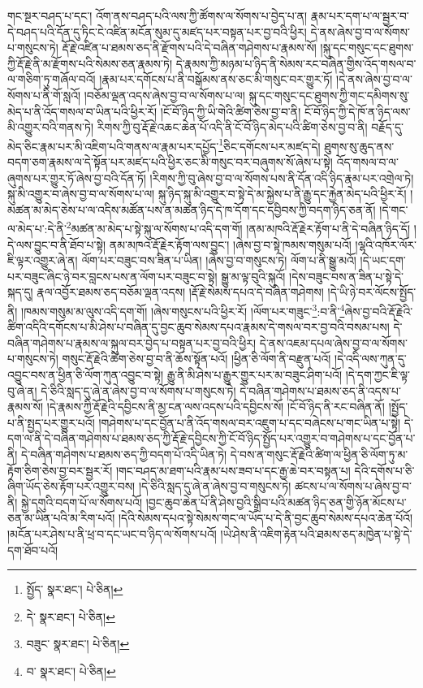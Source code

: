 གང་སྔར་བཤད་པ་དང་། འོག་ནས་བཤད་པའི་ལས་ཀྱི་ཚོགས་ལ་སོགས་པ་བྱེད་པ་ན། རྣམ་པར་དག་པ་ལ་སྦྱར་བ་དེ་བཤད་པའི་དོན་དུ་ཏིང་ངེ་འཛིན་མངོན་སུམ་དུ་མཛད་པར་བསྟན་པར་བྱ་བའི་ཕྱིར། དེ་ནས་ཞེས་བྱ་བ་ལ་སོགས་པ་གསུངས་ཏེ། རྡོ་རྗེ་འཛིན་པ་ཐམས་ཅད་ནི་རྫོགས་པའི་དེ་བཞིན་གཤེགས་པ་རྣམས་སོ། །སྐུ་དང་གསུང་དང་ཐུགས་ཀྱི་རྡོ་རྗེ་ནི་མ་རྫོགས་པའི་སེམས་ཅན་རྣམས་ཏེ། དེ་རྣམས་ཀྱི་མཉམ་པ་ཉིད་ནི་སེམས་རང་བཞིན་གྱིས་འོད་གསལ་བ་ལ་གཅིག་ཏུ་གཞོལ་བའོ། །རྣམ་པར་དགོངས་པ་ནི་བསྒོམས་ནས་ཅང་མི་གསུང་བར་གྱུར་ཏོ། །དེ་ནས་ཞེས་བྱ་བ་ལ་སོགས་པ་ནི་གོ་སླའོ། །བཅོམ་ལྡན་འདས་ཞེས་བྱ་བ་ལ་སོགས་པ་ལ། སྐུ་དང་གསུང་དང་ཐུགས་ཀྱི་གང་དམིགས་སུ་མེད་པ་ནི་འོད་གསལ་བ་ཡིན་པའི་ཕྱིར་རོ། །ངོ་བོ་ཉིད་ཀྱི་ཡི་གེའི་ཚིག་ཅེས་བྱ་བ་ནི། ངོ་བོ་ཉིད་ཀྱི་དེ་ཁོ་ན་ཉིད་ལས་མི་འགྱུར་བའི་གནས་ཏེ། རིགས་ཀྱི་བུ་རྡོ་རྗེ་འཆང་ཆེན་པོ་འདི་ནི་ངོ་བོ་ཉིད་མེད་པའི་ཚིག་ཅེས་བྱ་བ་ནི། བརྗོད་དུ་མེད་ཅིང་རྣམ་པར་མི་འཇིག་པའི་གནས་ལ་རྣམ་པར་དཔྱོད་\footnote{སྤྱོད་  སྣར་ཐང་།  པེ་ཅིན། }ཅིང་དགོངས་པར་མཛད་དེ། ཐུགས་སུ་ཆུད་ནས་བདག་ཅག་རྣམས་ལ་དེ་སྟོན་པར་མཛད་པའི་ཕྱིར་ཅང་མི་གསུང་བར་བཞུགས་སོ་ཞེས་པ་སྟེ། འོད་གསལ་བ་ལ་ཞུགས་པར་གྱུར་ཏོ་ཞེས་བྱ་བའི་དོན་ཏོ། །རིགས་ཀྱི་བུ་ཞེས་བྱ་བ་ལ་སོགས་པས་ནི་དོན་འདི་ཉིད་རྣམ་པར་འགྲེལ་ཏེ། སྐུ་མི་འགྱུར་བ་ཞེས་བྱ་བ་ལ་སོགས་པ་ལ། སྐུ་ཉིད་སྐུ་མི་འགྱུར་བ་སྟེ་དེ་མ་སྐྱེས་པ་ནི་རྒྱུ་དང་རྐྱེན་མེད་པའི་ཕྱིར་རོ། །མཚན་མ་མེད་ཅེས་པ་ལ་འདིས་མཚོན་པས་ན་མཚན་ཉིད་དེ་ཁ་དོག་དང་དབྱིབས་ཀྱི་བདག་ཉིད་ཅན་ནོ། །དེ་གང་ལ་མེད་པ་:དེ་ནི་\footnote{དེ་  སྣར་ཐང་།  པེ་ཅིན། }མཚན་མ་མེད་པ་སྟེ་སྐུ་ལ་སོགས་པ་འདི་དག་གོ། །ནམ་མཁའི་རྡོ་རྗེར་རྟོག་པ་ནི་དེ་བཞིན་ཉིད་དོ། །དེ་ལས་བྱུང་བ་ནི་ཐོབ་པ་སྟེ། ནམ་མཁའ་རྡོ་རྗེར་རྟོག་ལས་བྱུང་། །ཞེས་བྱ་བ་སྟེ་ཁམས་གསུམ་པའོ། །ལྷའི་འཁོར་ལོར་ཇི་ལྟར་འགྱུར་ཞེ་ན། ལོག་པར་བཟུང་བས་ཟིན་པ་ཡིན། །ཞེས་བྱ་བ་གསུངས་ཏེ། ལོག་པ་ནི་སྒྱུ་མའོ། །དེ་ཡང་དག་པར་བཟུང་ཞིང་ཉེ་བར་བླངས་པས་ན་ལོག་པར་བཟུང་བ་སྟེ། སྒྱུ་མ་ལྟ་བུའི་སྐུའོ། །དེས་བཟུང་བས་ན་ཟིན་པ་སྟེ་དེ་སྐད་དུ། རྣལ་འབྱོར་ཐམས་ཅད་བཅོམ་ལྡན་འདས། །རྡོ་རྗེ་སེམས་དཔའ་དེ་བཞིན་གཤེགས། །དེ་ཡི་ཉེ་བར་ལོངས་སྤྱོད་ནི། །ཁམས་གསུམ་མ་ལུས་འདི་དག་གོ། །ཞེས་གསུངས་པའི་ཕྱིར་རོ། །ལོག་པར་གཟུང་\footnote{བཟུང་  སྣར་ཐང་།  པེ་ཅིན། }:བ་ནི་\footnote{བ་  སྣར་ཐང་།  པེ་ཅིན། }ཞེས་བྱ་བའི་རྡོ་རྗེའི་ཚིག་འདིའི་དགོངས་པ་མི་ཤེས་པ་བཞིན་དུ་བྱང་ཆུབ་སེམས་དཔའ་རྣམས་དེ་གསལ་བར་བྱ་བའི་བསམ་པས། དེ་བཞིན་གཤེགས་པ་རྣམས་ལ་སྐུལ་བར་བྱེད་པ་བསྟན་པར་བྱ་བའི་ཕྱིར། དེ་ནས་འཇམ་དཔལ་ཞེས་བྱ་བ་ལ་སོགས་པ་གསུངས་ཏེ། གསུང་རྡོ་རྗེའི་ཚིག་ཅེས་བྱ་བ་ནི་ཆོས་སྟོན་པའོ། །ཕྱིན་ཅི་ལོག་ནི་བརྫུན་པའོ། །དེ་འདི་ལས་ཀུན་དུ་འབྱུང་བས་ན་ཕྱིན་ཅི་ལོག་ཀུན་འབྱུང་བ་སྟེ། རྒྱུ་ནི་མི་ཤེས་པ་རྒྱུར་གྱུར་པར་མ་བཟུང་ཤིག་པའོ། །དེ་དག་ཀྱང་ཇི་ལྟ་བུ་ཞེ་ན། དེ་ཅིའི་སླད་དུ་ཞེ་ན་ཞེས་བྱ་བ་ལ་སོགས་པ་གསུངས་ཏེ། དེ་བཞིན་གཤེགས་པ་ཐམས་ཅད་ནི་འདས་པ་རྣམས་སོ། །དེ་རྣམས་ཀྱི་རྡོ་རྗེའི་དབྱིངས་ནི་མྱ་ངན་ལས་འདས་པའི་དབྱིངས་སོ། །ངོ་བོ་ཉིད་ནི་རང་བཞིན་ནོ། །སྤྱོད་པ་ནི་སྤྱད་པར་གྱུར་པའོ། །གཤེགས་པ་དང་བྱོན་པ་ནི་འོད་གསལ་བར་འཇུག་པ་དང་བཞེངས་པ་གང་ཡིན་པ་སྟེ། དེ་དག་ལ་ནི་དེ་བཞིན་གཤེགས་པ་ཐམས་ཅད་ཀྱི་རྡོ་རྗེ་དབྱིངས་ཀྱི་ངོ་བོ་ཉིད་སྤྱོད་པར་འགྱུར་བ་གཤེགས་པ་དང་བྱོན་པ་ནི། དེ་བཞིན་གཤེགས་པ་ཐམས་ཅད་ཀྱི་བདག་པོ་འདི་ཡིན་ཏེ། དེ་བས་ན་གསུང་རྡོ་རྗེའི་ཚིག་ལ་ཕྱིན་ཅི་ལོག་ཏུ་མ་རྟོག་ཅིག་ཅེས་བྱ་བར་སྦྱར་རོ། །གང་བཤད་མ་ཐག་པའི་རྣམ་པས་ཟབ་པ་དང་རྒྱ་ཆེ་བར་བསྟན་པ། དེའི་དགོས་པ་ཅི་ཞིག་ཡོད་ཅེས་རྟོག་པར་འགྱུར་བས། །དེ་ཅིའི་སླད་དུ་ཞེ་ན་ཞེས་བྱ་བ་གསུངས་ཏེ། ཚངས་པ་ལ་སོགས་པ་ཞེས་བྱ་བ་ནི། སྐྱེ་དགུའི་བདག་པོ་ལ་སོགས་པའོ། །བྱང་ཆུབ་ཆེན་པོ་ནི་ཤེས་བྱའི་སྒྲིབ་པའི་མཚན་ཉིད་ཅན་གྱི་ཉོན་མོངས་པ་ཅན་མ་ཡིན་པའི་མ་རིག་པའོ། །དེའི་སེམས་དཔའ་སྟེ་སེམས་གང་ལ་ཡོད་པ་དེ་ནི་བྱང་ཆུབ་སེམས་དཔའ་ཆེན་པོའོ། །མངོན་པར་ཤེས་པ་ནི་ཕྲ་བ་དང་ཡང་བ་ཉིད་ལ་སོགས་པའོ། །ཡེ་ཤེས་ནི་འཇིག་རྟེན་པའི་ཐམས་ཅད་མཁྱེན་པ་སྟེ་དེ་དག་ཐོབ་པའོ། 